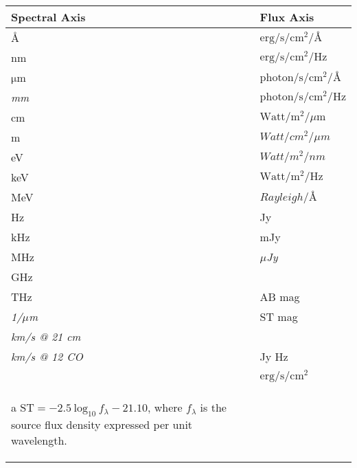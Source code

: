 \begin{threeparttable}
\centering
\begin{tabular}{ll}
    \toprule
    Spectral Axis                & Flux Axis \\
    \midrule
    \mbox{\AA}              & $\mathrm{erg}/\mathrm{s}/\mathrm{cm}^{2}/\mbox{\AA}$     \\
    nm                      & $\mathrm{erg}/\mathrm{s}/\mathrm{cm}^{2}/\mathrm{Hz}$    \\
    $\mathrm{\mu}$m         & $\mathrm{photon}/\mathrm{s}/\mathrm{cm}^{2}/\mbox{\AA}$  \\
    \textit{mm}                      & $\mathrm{photon}/\mathrm{s}/\mathrm{cm}^{2}/\mathrm{Hz}$ \\
    cm                      & $\mathrm{Watt}/\mathrm{m}^{2}/{\mu}\mathrm{m}$           \\
    m                       & \textit{$Watt/cm^{2}/{\mu}m$}            \\
    eV                      & \textit{$Watt/m^{2}/nm$}               \\
    keV                     & $\mathrm{Watt}/\mathrm{m}^{2}/\mathrm{Hz}$               \\
    MeV                     & \textit{$Rayleigh/\mbox{\AA}$}                           \\
    Hz                      & Jy                									   \\
    kHz                     & mJy               									   \\
    MHz                     & \textit{${\mu}$Jy}             								   \\
    GHz                     & ~                 									   \\
    THz                     & AB mag           										   \\
    \textit{1/${\mu}$m}              & ST mag\tnote{a}             									   \\
    \textit{km/s @ 21 cm}            & ~               										   \\
    \textit{km/s @ 12 CO}            & Jy Hz             									   \\
    ~ 					    & $\mathrm{erg}/\mathrm{s}/\mathrm{cm}^{2}$                \\
    \bottomrule
\begin{tablenotes}
\item [a] $\mathrm{ST = -2.5~log_{10}}~f_{\lambda} - 21.10$, where $f_{\lambda}$ is
          the source flux density expressed per unit wavelength.
\end{tablenotes}
\end{tabular}
\end{threeparttable}